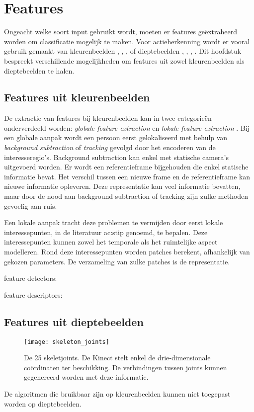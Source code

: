 \chapter{Features}
Ongeacht welke soort input gebruikt wordt, moeten er features geëxtraheerd worden om classificatie mogelijk te maken. Voor actieherkenning wordt er vooral gebruik gemaakt van kleurenbeelden \cite{Laptev2008}, \cite{Dollar2005}, \cite{Willems2008}, \cite{Wang2011} of dieptebeelden \cite{Li2010}, \cite{Wang2012a}, \cite{Xia2012}, \cite{Gu2010}. Dit hoofdstuk bespreekt verschillende mogelijkheden om features uit zowel kleurenbeelden als dieptebeelden te halen. 

\section{Features uit kleurenbeelden}
De extractie van features bij kleurenbeelden kan in twee categorieën onderverdeeld worden: \textit{globale feature extraction} en \textit{lokale feature extraction} \cite{Poppe2010}. Bij een globale aanpak wordt een persoon eerst gelokaliseerd met behulp van \textit{background subtraction} of \textit{tracking} gevolgd door het encoderen van de interesseregio's. Background subtraction kan enkel met statische camera's uitgevoerd worden. Er wordt een referentieframe bijgehouden die enkel statische informatie bevat. Het verschil tussen een nieuwe frame en de referentieframe kan nieuwe informatie opleveren. Deze representatie kan veel informatie bevatten, maar door de nood aan background subtraction of tracking zijn zulke methoden gevoelig aan ruis.

Een lokale aanpak tracht deze problemen te vermijden door eerst lokale interessepunten, in de literatuur \gls{ac:stip} genoemd, te bepalen. Deze interessepunten kunnen zowel het temporale als het ruimtelijke aspect modelleren. Rond deze interessepunten worden patches berekent, afhankelijk van gekozen parameters. De verzameling van zulke patches is de representatie. 
 
feature detectors:

feature descriptors:
 
\section{Features uit dieptebeelden}
\begin{figure}
	\centering
	\texttt{[image: skeleton\_joints]}
	\caption{De 25 skeletjoints. De Kinect stelt enkel de drie-dimensionale coördinaten ter beschikking. De verbindingen tussen joints kunnen gegenereerd worden met deze informatie.}
	\label{fig:skeleton_joints}
\end{figure}
De algoritmen die bruikbaar zijn op kleurenbeelden kunnen niet toegepast worden op dieptebeelden. 



